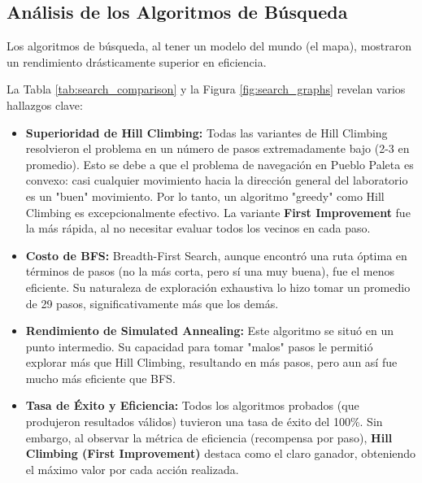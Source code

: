 \documentclass[12pt, oneside, openany]{book}
\begin{document}
\subsection{Análisis de los Algoritmos de Búsqueda}
Los algoritmos de búsqueda, al tener un modelo del mundo (el mapa), mostraron un rendimiento drásticamente superior en eficiencia.



La Tabla \ref{tab:search_comparison} y la Figura \ref{fig:search_graphs} revelan varios hallazgos clave:
\begin{itemize}
    \item \textbf{Superioridad de Hill Climbing:} Todas las variantes de Hill Climbing resolvieron el problema en un número de pasos extremadamente bajo (2-3 en promedio). Esto se debe a que el problema de navegación en Pueblo Paleta es convexo: casi cualquier movimiento hacia la dirección general del laboratorio es un "buen" movimiento. Por lo tanto, un algoritmo "greedy" como Hill Climbing es excepcionalmente efectivo. La variante \textbf{First Improvement} fue la más rápida, al no necesitar evaluar todos los vecinos en cada paso.
    \item \textbf{Costo de BFS:} Breadth-First Search, aunque encontró una ruta óptima en términos de pasos (no la más corta, pero sí una muy buena), fue el menos eficiente. Su naturaleza de exploración exhaustiva lo hizo tomar un promedio de 29 pasos, significativamente más que los demás.
    \item \textbf{Rendimiento de Simulated Annealing:} Este algoritmo se situó en un punto intermedio. Su capacidad para tomar "malos" pasos le permitió explorar más que Hill Climbing, resultando en más pasos, pero aun así fue mucho más eficiente que BFS.
    \item \textbf{Tasa de Éxito y Eficiencia:} Todos los algoritmos probados (que produjeron resultados válidos) tuvieron una tasa de éxito del 100\%. Sin embargo, al observar la métrica de eficiencia (recompensa por paso), \textbf{Hill Climbing (First Improvement)} destaca como el claro ganador, obteniendo el máximo valor por cada acción realizada.
\end{itemize}
\end{document}
